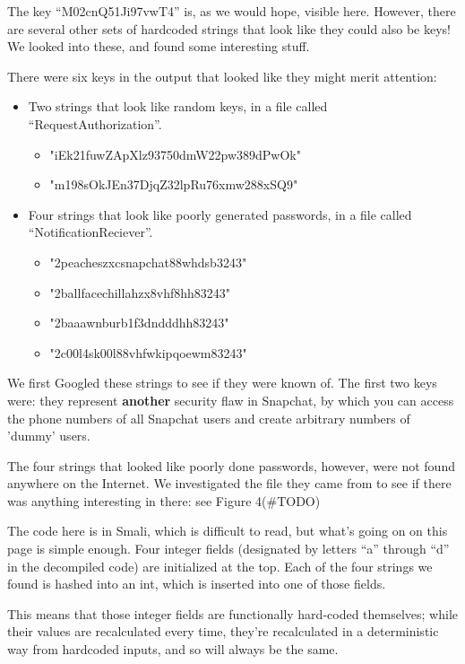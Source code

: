 \documentclass[11pt]{article}
\numberwithin{theorem}{subsection}
\begin{document}
The key ``M02cnQ51Ji97vwT4'' is, as we would hope, visible here.  However, there are several other sets of
hardcoded strings that look like they could also be keys!  We looked into these, and found some interesting stuff.

There were six keys in the output that looked like they might merit attention:

\begin{itemize}
\item Two strings that look like random keys, in a file called ``RequestAuthorization''. 
\begin{itemize}
\item "iEk21fuwZApXlz93750dmW22pw389dPwOk"
\item "m198sOkJEn37DjqZ32lpRu76xmw288xSQ9"
\end{itemize}
\item Four strings that look like poorly generated passwords, in a file called ``NotificationReciever''.
\begin{itemize}
\item "2peacheszxcsnapchat88whdsb3243"
\item "2ballfacechillahzx8vhf8hh83243"
\item "2baaawnburb1f3dndddhh83243"
\item "2c00l4sk00l88vhfwkipqoewm83243"
\end{itemize}
\end{itemize}

We first Googled these strings to see if they were known of.  The first two keys were: they represent \textbf{another} security
flaw in Snapchat, by which you can access the phone numbers of all Snapchat users and create arbitrary numbers of 'dummy' users.\cite{snapchatFlaw2}

The four strings that looked like poorly done passwords, however, were not found anywhere on the Internet.  We investigated the file
they came from to see if there was anything interesting in there: see Figure 4(\#TODO)

The code here is in Smali, which is difficult to read, but what's going on on this page is simple enough.  Four integer fields (designated by
letters ``a'' through ``d'' in the decompiled code) are initialized at the top.  Each of the four strings we found is hashed into an int, which 
is inserted into one of those fields.

This means that those integer fields are functionally hard-coded themselves; while their values are recalculated every time, they're recalculated in a
deterministic way from hardcoded inputs, and so will always be the same.
\end{document}
